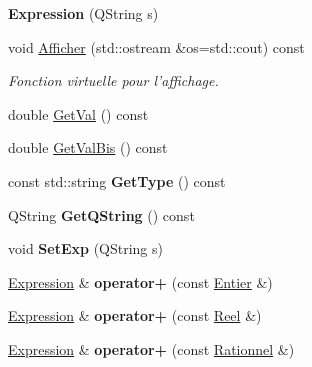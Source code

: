\begin{DoxyCompactItemize}
\item 
\hypertarget{class_expression_ac25fb301ae3947c964a4da9a95883e72}{{\bfseries Expression} (Q\-String s)}\label{class_expression_ac25fb301ae3947c964a4da9a95883e72}

\item 
void \hyperlink{class_expression_a82c745bad73c0adf286f893febaf7406}{Afficher} (std\-::ostream \&os=std\-::cout) const 
\begin{DoxyCompactList}\small\item\em Fonction virtuelle pour l'affichage. \end{DoxyCompactList}\item 
double \hyperlink{class_expression_addc8118b94c445af0da80e8e661dfd6a}{Get\-Val} () const 
\item 
double \hyperlink{class_expression_ad602729011040226673d7c1ee94367d9}{Get\-Val\-Bis} () const 
\item 
\hypertarget{class_expression_aa96b1065b6d35277b2c30c25966eccfb}{const std\-::string {\bfseries Get\-Type} () const }\label{class_expression_aa96b1065b6d35277b2c30c25966eccfb}

\item 
\hypertarget{class_expression_ab64fbbad486a07035ada97ae21786db4}{Q\-String {\bfseries Get\-Q\-String} () const }\label{class_expression_ab64fbbad486a07035ada97ae21786db4}

\item 
\hypertarget{class_expression_accbdcaab3d8ffc239d83618d49574733}{void {\bfseries Set\-Exp} (Q\-String s)}\label{class_expression_accbdcaab3d8ffc239d83618d49574733}

\item 
\hypertarget{class_expression_a9059e6564e7737b2b5f22bb101f0e983}{\hyperlink{class_expression}{Expression} \& {\bfseries operator+} (const \hyperlink{class_entier}{Entier} \&)}\label{class_expression_a9059e6564e7737b2b5f22bb101f0e983}

\item 
\hypertarget{class_expression_aea5f4c261ddbc4933a5e33a309e88aae}{\hyperlink{class_expression}{Expression} \& {\bfseries operator+} (const \hyperlink{class_reel}{Reel} \&)}\label{class_expression_aea5f4c261ddbc4933a5e33a309e88aae}

\item 
\hypertarget{class_expression_aab7cfa2f6b1c04012ce6b054b3c7d67e}{\hyperlink{class_expression}{Expression} \& {\bfseries operator+} (const \hyperlink{class_rationnel}{Rationnel} \&)}\label{class_expression_aab7cfa2f6b1c04012ce6b054b3c7d67e}


\end{DoxyCompactItemize}

